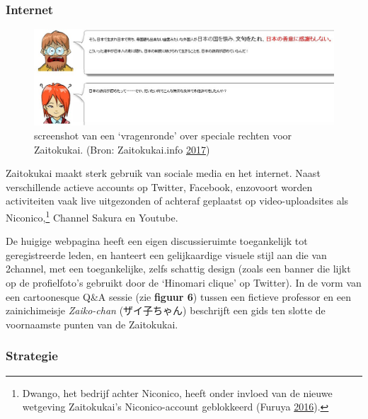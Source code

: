 \documentclass[10.5pt,dutch,]{article}
\begin{document}
\subsubsection{Internet}\label{internet}

\begin{figure}[htbp]
\centering
\includegraphics{images/zaitokukai_site_qa.jpg}
\caption{screenshot van een `vragenronde' over speciale rechten voor
Zaitokukai. (Bron: Zaitokukai.info
\protect\hyperlink{ref-zaitokukai.infoux5fzaitokukaiux5f2017}{2017})}
\end{figure}

Zaitokukai maakt sterk gebruik van sociale media en het internet. Naast
verschillende actieve accounts op Twitter, Facebook, enzovoort worden
activiteiten vaak live uitgezonden of achteraf geplaatst op
video-uploadsites als Niconico,\footnote{Dwango, het bedrijf achter
  Niconico, heeft onder invloed van de nieuwe wetgeving Zaitokukai's
  Niconico-account geblokkeerd (Furuya
  \protect\hyperlink{ref-furuyaux5fcanux5f2016}{2016}).} Channel Sakura
en Youtube.

De huigige webpagina heeft een eigen discussieruimte toegankelijk tot
geregistreerde leden, en hanteert een gelijkaardige visuele stijl aan
die van 2channel, met een toegankelijke, zelfs schattig design (zoals
een banner die lijkt op de profielfoto's gebruikt door de `Hinomari
clique' op Twitter). In de vorm van een cartoonesque Q\&A sessie (zie
\textbf{figuur 6}) tussen een fictieve professor en een zainichimeisje
\emph{Zaiko-chan} (ザイ子ちゃん) beschrijft een gids ten slotte de
voornaamste punten van de Zaitokukai.

\subsubsection{Strategie}\label{strategie}
\end{document}
